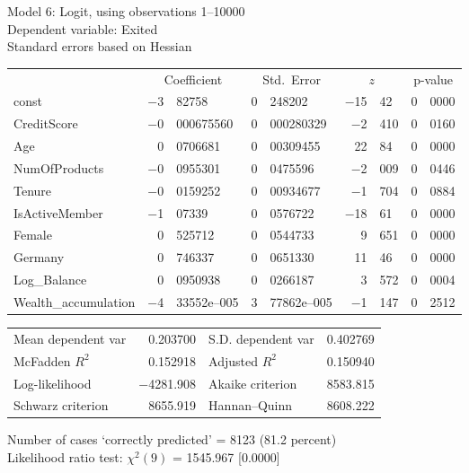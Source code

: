 \documentclass[11pt]{article}
\begin{document}
\thispagestyle{empty}

\begin{center}

Model 6: Logit, using observations 1--10000\\
Dependent variable: Exited\\
Standard errors based on Hessian

\vspace{1em}

\begin{tabular}{lr@{.}lr@{.}lr@{.}lr@{.}l}
  &
 \multicolumn{2}{c}{Coefficient} &
  \multicolumn{2}{c}{Std.\ Error} &
   \multicolumn{2}{c}{$z$} &
    \multicolumn{2}{c}{p-value} \\[1ex]
const &
  $-$3&82758 &
    0&248202 &
      $-$15&42 &
        0&0000 \\
CreditScore &
  $-$0&000675560 &
    0&000280329 &
      $-$2&410 &
        0&0160 \\
Age &
  0&0706681 &
    0&00309455 &
      22&84 &
        0&0000 \\
NumOfProducts &
  $-$0&0955301 &
    0&0475596 &
      $-$2&009 &
        0&0446 \\
Tenure &
  $-$0&0159252 &
    0&00934677 &
      $-$1&704 &
        0&0884 \\
IsActiveMember &
  $-$1&07339 &
    0&0576722 &
      $-$18&61 &
        0&0000 \\
Female &
  0&525712 &
    0&0544733 &
      9&651 &
        0&0000 \\
Germany &
  0&746337 &
    0&0651330 &
      11&46 &
        0&0000 \\
Log\_Balance &
  0&0950938 &
    0&0266187 &
      3&572 &
        0&0004 \\
Wealth\_accumulation &
  $-$4&33552\textrm{e--005} &
    3&77862\textrm{e--005} &
      $-$1&147 &
        0&2512 \\
\end{tabular}

\vspace{1ex}
\begin{tabular}{lrlr}
Mean dependent var &  0.203700 & S.D. dependent var &  0.402769 \\
McFadden $R^2$ &  0.152918 & Adjusted $R^2$ &  0.150940 \\
Log-likelihood & $-$4281.908 & Akaike criterion &  8583.815 \\
Schwarz criterion &  8655.919 & Hannan--Quinn &  8608.222 \\
\end{tabular}


\vspace{1ex}
\vspace{1em}
\begin{raggedright}
Number of cases `correctly predicted' = 8123 (81.2 percent)\\
Likelihood ratio test: $\chi^2(9)$ = 1545.967 [0.0000]\\
\end{raggedright}

\end{center}
\end{document}

